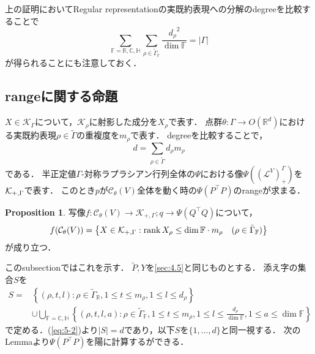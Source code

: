 \documentclass[11pt]{article}
\theoremstyle{definition}
\newtheorem{prop}[defi]{Proposition}
\begin{document}
    上の証明においてRegular representationの実既約表現への分解のdegreeを比較することで
    \begin{equation} \label{eq:5-1}
        \sum_{\mathbb{F} = \mathbb{R}, \mathbb{C}, \mathbb{H}}
        \sum_{\rho \in \tilde{\Gamma}_\mathbb{F}} \frac{{d_\rho}^2}{\dim \mathbb{F}} = |\Gamma|
    \end{equation}
    が得られることにも注意しておく．
\subsection{rangeに関する命題}
    $X \in \mathcal{K}_\Gamma$について，$\mathcal{K}_\rho$に射影した成分を$X_\rho$で表す．
    点群$\theta:\Gamma \rightarrow O(\mathbb{R}^d)$における実既約表現$\rho \in \tilde{\Gamma}$の重複度を$m_\rho$で表す．
    degreeを比較することで，
    \begin{equation} \label{eq:5-2}
        d = \sum_{\rho \in \tilde{\Gamma}}d_\rho m_\rho
    \end{equation}
    である．
    半正定値$\Gamma$-対称ラプラシアン行列全体の$\Psi$における像$\Psi((\mathcal{L}^V)_+^\Gamma)$を${\cal K}_{+,\Gamma}$で表す．
    このとき$p$が$\mathcal{C}_\theta(V)$全体を動く時の$\Psi(P^\top P)$のrangeが求まる．
    \begin{prop} \label{prop:range2}
        写像$f:\mathcal{C}_\theta(V) \rightarrow \mathcal{K}_{+,\Gamma};q\rightarrow \Psi(Q^\top Q)$について，
        \[
            f(\mathcal{C}_\theta(V)) = \left\{ X \in \mathcal{K}_{+,\Gamma} 
            : \rank X_\rho \leq \dim \mathbb{F} \cdot m_\rho \quad (\rho \in \tilde{\Gamma}_\mathbb{F}) \right\}
        \]
        が成り立つ．
    \end{prop}
    このsubsectionではこれを示す．
    $\tilde{P}, Y$を\ref{sec:4.5}と同じものとする．
    添え字の集合$S$を
    \begin{align*}
        S=&\left\{(\rho,t,l): \rho \in \tilde{\Gamma}_\mathbb{R}, 1 \leq t \leq m_\rho, 1 \leq l \leq d_\rho \right\} \\
        &\cup \bigcup_{\mathbb{F}=\mathbb{C},\mathbb{H}} \left\{ (\rho,t,l,a) : \rho \in \tilde{\Gamma}_\mathbb{F}, 1 \leq t \leq m_\rho, 
        1 \leq l \leq \frac{d_\rho}{\dim \mathbb{F}}, 1\leq a \leq \dim\mathbb{F} \right\}
    \end{align*}
    で定める．(\ref{eq:5-2})より$|S|=d$であり，以下$S$を$\{1, \ldots, d\}$と同一視する．
    次のLemmaより$\Psi(P^\top P)$を陽に計算するができる．
\end{document}
